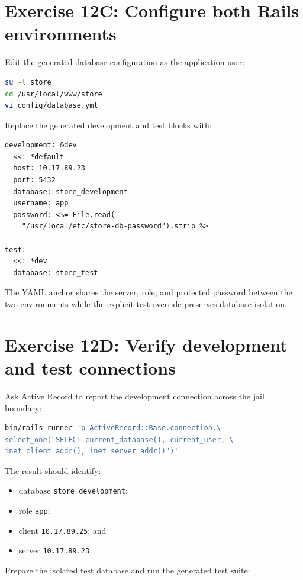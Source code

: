 \section{Exercise 12C: Configure both Rails environments}

Edit the generated database configuration as the application user:

\begin{lstlisting}[language=sh]
su -l store
cd /usr/local/www/store
vi config/database.yml
\end{lstlisting}

Replace the generated development and test blocks with:

\begin{lstlisting}
development: &dev
  <<: *default
  host: 10.17.89.23
  port: 5432
  database: store_development
  username: app
  password: <%= File.read(
    "/usr/local/etc/store-db-password").strip %>

test:
  <<: *dev
  database: store_test
\end{lstlisting}

The YAML anchor shares the server, role, and protected password between the
two environments while the explicit test override preserves database
isolation.

\section{Exercise 12D: Verify development and test connections}

Ask Active Record to report the development connection across the jail
boundary:

\begin{lstlisting}[language=sh]
bin/rails runner 'p ActiveRecord::Base.connection.\
select_one("SELECT current_database(), current_user, \
inet_client_addr(), inet_server_addr()")'
\end{lstlisting}

The result should identify:

\begin{itemize}
  \item database \texttt{store\_development};
  \item role \texttt{app};
  \item client \texttt{10.17.89.25}; and
  \item server \texttt{10.17.89.23}.
\end{itemize}

Prepare the isolated test database and run the generated test suite:

